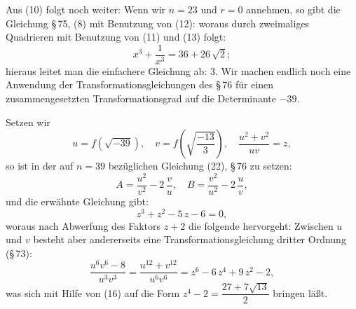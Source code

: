 Aus (10) folgt noch weiter:
Wenn wir $n=23$ und $r=0$ annehmen, so gibt die Gleichung \S\,75, (8)
mit Benutzung von (12):
woraus durch zweimaliges Quadrieren mit Benutzung von (11) und (13) folgt:
\[
x^3+\frac{1}{x^3}=36+26\,\sqrt2;
\]
hieraus leitet man die einfachere Gleichung ab:
3. Wir machen endlich noch eine Anwendung der Transformationsgleichungen
des \S\,76 für einen zusammengesetzten Transformationsgrad auf die
Determinante $-39$.

Setzen wir
\[
u=f(\sqrt{-39}),\quad v=f\!\left(\sqrt{\dfrac{-13}{3}}\right),\quad \frac{u^2+v^2}{uv}=z,
\]
so ist in der auf $n=39$ bezüglichen Gleichung (22), \S\,76 zu setzen:
\[
A=\frac{u^2}{v^2}-2\,\frac{v}{u},\quad B=\frac{v^2}{u^2}-2\,\frac{u}{v},
\]
und die erwähnte Gleichung gibt:
\[
z^3+z^2-5\,z-6=0,
\]
woraus nach Abwerfung des Faktors $z+2$ die folgende hervorgeht:
Zwischen $u$ und $v$ besteht aber andererseits eine
Transformationsgleichung dritter Ordnung (\S\,73):
\[
\frac{u^6v^6-8}{u^3v^3}=\frac{u^{12}+v^{12}}{u^6v^6}=z^6-6\,z^4+9\,z^2-2,
\]
was sich mit Hilfe von (16) auf die Form $z^4-2=\dfrac{27+7\sqrt{13}}{2}$
bringen läßt.
